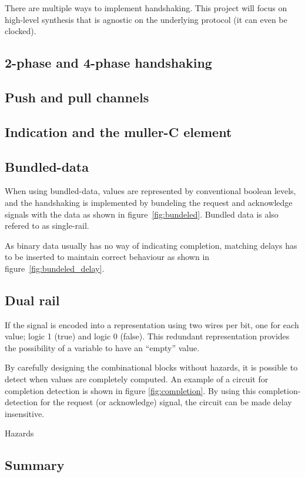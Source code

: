 There are multiple ways to implement handshaking. This project will
focus on high-level synthesis that is agnostic on the underlying
protocol (it can even be clocked). 

\subsection{2-phase and 4-phase handshaking}


\subsection{Push and pull channels}

\subsection{Indication and the muller-C element}

\subsection{Bundled-data}

When using bundled-data, values are represented by conventional
boolean levels, and the handshaking is implemented by bundeling the
request and acknowledge signals with the data as shown in
figure~\ref{fig:bundeled}. Bundled data is also refered to as
single-rail.

As binary data usually has no way of indicating completion, matching
delays has to be inserted to maintain correct behaviour as shown in
figure~\ref{fig:bundeled_delay}.

\subsection{Dual rail}

If the signal is encoded into a representation using two wires per
bit, one for each value; logic 1 (true) and logic 0 (false). This
redundant representation provides the possibility of a variable to
have an ``empty'' value. 

By carefully designing the combinational blocks without hazards, it is
possible to detect when values are completely computed. An example of
a circuit for completion detection is shown in figure
\ref{fig:completion}. By using this completion-detection for the
request (or acknowledge) signal, the circuit can be made delay
insensitive.

Hazards

\subsection{Summary}



